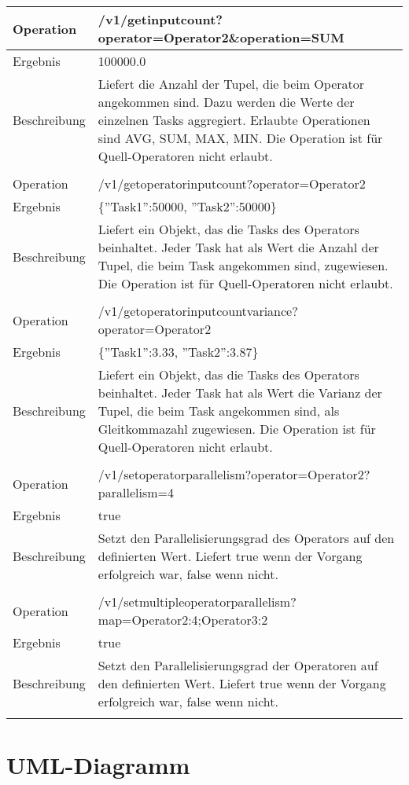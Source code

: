 \begin{longtable}{|p{2cm}|p{12cm}|}
Operation & /v1/getinputcount?operator=Operator2\&operation=SUM \\ \hline
Ergebnis & 100000.0 \\ \hline
Beschreibung & Liefert die Anzahl der Tupel, die beim Operator angekommen sind. Dazu werden die Werte der einzelnen Tasks aggregiert. Erlaubte Operationen sind AVG, SUM, MAX, MIN. Die Operation ist für Quell-Operatoren nicht erlaubt.\\ \hline
\multicolumn{2}{|l|}{} \\ \hline

Operation & /v1/getoperatorinputcount?operator=Operator2 \\ \hline
Ergebnis & \{''Task1'':50000, ''Task2'':50000\} \\ \hline
Beschreibung & Liefert ein Objekt, das die Tasks des Operators beinhaltet. Jeder Task hat als Wert die Anzahl der Tupel, die beim Task angekommen sind, zugewiesen. Die Operation ist für Quell-Operatoren nicht erlaubt.\\ \hline
\multicolumn{2}{|l|}{} \\ \hline

Operation & /v1/getoperatorinputcountvariance?operator=Operator2 \\ \hline
Ergebnis & \{''Task1'':3.33, ''Task2'':3.87\} \\ \hline
Beschreibung & Liefert ein Objekt, das die Tasks des Operators beinhaltet. Jeder Task hat als Wert die Varianz der Tupel, die beim Task angekommen sind, als Gleitkommazahl zugewiesen. Die Operation ist für Quell-Operatoren nicht erlaubt. \\ \hline
\multicolumn{2}{|l|}{} \\ \hline

Operation & /v1/setoperatorparallelism?operator=Operator2?parallelism=4 \\ \hline
Ergebnis & true \\ \hline
Beschreibung & Setzt den Parallelisierungsgrad des Operators auf den definierten Wert. Liefert true wenn der Vorgang erfolgreich war, false wenn nicht. \\ \hline
\multicolumn{2}{|l|}{} \\ \hline

Operation & /v1/setmultipleoperatorparallelism?map=Operator2:4;Operator3:2 \\ \hline
Ergebnis & true \\ \hline
Beschreibung & Setzt den Parallelisierungsgrad der Operatoren auf den definierten Wert. Liefert true wenn der Vorgang erfolgreich war, false wenn nicht. \\ \hline
\multicolumn{2}{|l|}{} \\ \hline

\end{longtable}

\section{UML-Diagramm}








